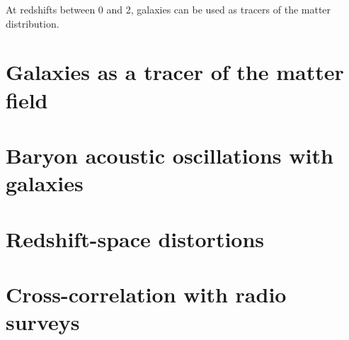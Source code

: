 \chaptertoc{}

At redshifts between 0 and 2, galaxies can be used as tracers of
the matter distribution. 

\section{Galaxies as a tracer of the matter field}

\section{Baryon acoustic oscillations with galaxies}

\section{Redshift-space distortions}

\section{Cross-correlation with radio surveys}

